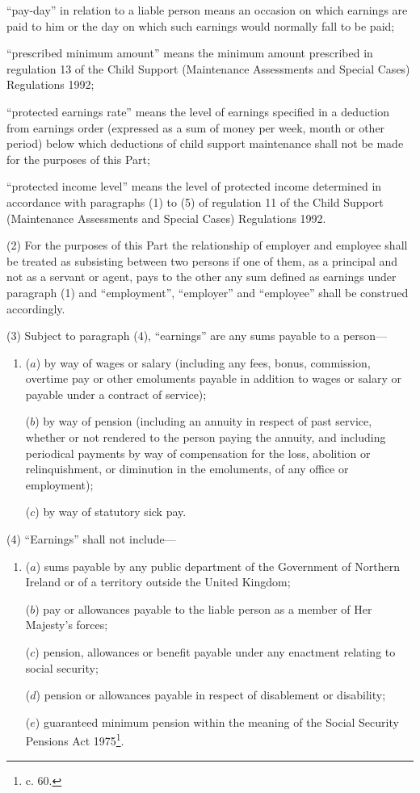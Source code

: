 \documentclass[a4paper]{article}
\begin{document}
\begin{enumerate}
“pay-day” in relation to a liable person means an occasion on which earnings are paid to him or the day on which such earnings would normally fall to be paid;

“prescribed minimum amount” means the minimum amount prescribed in regulation 13 of the Child Support (Maintenance Assessments and Special Cases) Regulations 1992;

“protected earnings rate” means the level of earnings specified in a deduction from earnings order (expressed as a sum of money per week, month or other period) below which deductions of child support maintenance shall not be made for the purposes of this Part;

“protected income level” means the level of protected income determined in accordance with 
paragraphs (1) to (5) of  %
regulation 11 of the Child Support (Maintenance Assessments and Special Cases) Regulations 1992.
\end{enumerate}

(2) For the purposes of this Part the relationship of employer and employee shall be treated as subsisting between two persons if one of them, as a principal and not as a servant or agent, pays to the other any sum defined as earnings under paragraph (1) and “employment”, “employer” and “employee” shall be construed accordingly.

(3) Subject to paragraph (4), “earnings” are any sums payable to a person—
\begin{enumerate}\item[]
($a$) by way of wages or salary (including any fees, bonus, commission, overtime pay or other emoluments payable in addition to wages or salary or payable under a contract of service);

($b$) by way of pension (including an annuity in respect of past service, whether or not rendered to the person paying the annuity, and including periodical payments by way of compensation for the loss, abolition or relinquishment, or diminution in the emoluments, of any office or employment);

($c$) by way of statutory sick pay.
\end{enumerate}

(4) “Earnings” shall not include—
\begin{enumerate}\item[]
($a$) sums payable by any public department of the Government of Northern Ireland or of a territory outside the United Kingdom;

($b$) pay or allowances payable to the liable person as a member of Her Majesty’s forces;

($c$) pension, allowances or benefit payable under any enactment relating to social security;

($d$) pension or allowances payable in respect of disablement or disability;

($e$) guaranteed minimum pension within the meaning of the Social Security Pensions Act 1975\footnote{ c. 60.}.
\end{enumerate}
\end{document}

